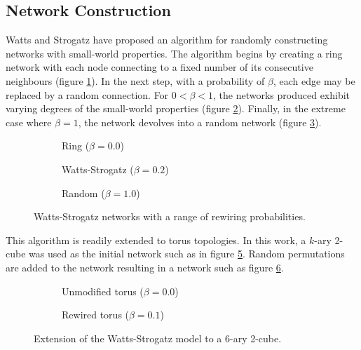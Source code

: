 		\subsection{Network Construction}
		
			Watts and Strogatz have proposed an algorithm for randomly constructing
			networks with small-world properties\cite{watts98}. The algorithm begins
			by creating a ring network with each node connecting to a fixed number of
			its consecutive neighbours (figure \ref{fig:ringNetworkB0}). In the next
			step, with a probability of $\beta$, each edge may be replaced by a random
			connection. For $0 < \beta < 1$, the networks produced exhibit varying
			degrees of the small-world properties (figure \ref{fig:ringNetworkB02}).
			Finally, in the extreme case where $\beta=1$, the network devolves into a
			random network (figure \ref{fig:ringNetworkB1}).
			
			\begin{figure}
				\center
				\begin{subfigure}[t]{0.3\textwidth}
					\center
					
					\caption{Ring ($\beta = 0.0$)}
					\label{fig:ringNetworkB0}
				\end{subfigure}
				\begin{subfigure}[t]{0.3\textwidth}
					\center
					
					\caption{Watts-Strogatz ($\beta = 0.2$)}
					\label{fig:ringNetworkB02}
				\end{subfigure}
				\begin{subfigure}[t]{0.3\textwidth}
					\center
					
					\caption{Random ($\beta = 1.0$)}
					\label{fig:ringNetworkB1}
				\end{subfigure}
				
				\caption{Watts-Strogatz networks with a range of rewiring
				probabilities.}
				\label{fig:ringNetwork}
			\end{figure}
			
			This algorithm is readily extended to torus topologies. In this work, a
			$k$-ary 2-cube was used as the initial network such as in figure
			\ref{fig:torusNetworkB0}. Random permutations are added to the network
			resulting in a network such as figure \ref{fig:torusNetworkB01}.
			
			\begin{figure}
				\center
				\begin{subfigure}[t]{0.45\textwidth}
					\center
					
					\caption{Unmodified torus ($\beta=0.0$)}
					\label{fig:torusNetworkB0}
				\end{subfigure}
				\begin{subfigure}[t]{0.45\textwidth}
					\center
					
					\caption{Rewired torus ($\beta=0.1$)}
					\label{fig:torusNetworkB01}
				\end{subfigure}
				
				\caption{Extension of the Watts-Strogatz model to a 6-ary 2-cube.}
				\label{fig:torusNetwork}
			\end{figure}
			
